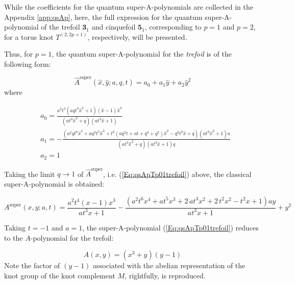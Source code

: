 \documentclass[a4paper,titlepage,twoside]{book}
\begin{document}
While the coefficients for the quantum super-A-polynomials are collected in the Appendix \ref{app:qsAp}, here, the full expression for the quantum super-A-polynomial of the trefoil $\mathbf{3}_1$ and cinquefoil $\mathbf{5}_1$, corresponding to $p=1$ and $p=2$, for a torus knot $T^{(2,2p+1)}$, respectively, will be presented.  

Thus, for $p=1$, the quantum super-A-polynomial for the \emph{trefoil} is of the following form:

\begin{equation}
  \widehat{A}^{\text{super}}(\widehat{x}, \widehat{y}; a, q, t ) = a_0 + a_1 \widehat{y} + a_2\widehat{y}^2 \label{Eq:qsApTp01trefoil}
\end{equation}
where

\[
\begin{aligned}
  & a_0 =  \frac{a^{2} t^{4} {\left(a q t^{3} \widehat{x}^{2} + 1\right)}  {\left(\widehat{x} - 1\right)} \widehat{x}^{3}}{{\left(a t^{3} \widehat{x}^{2} + q\right)} {\left(a t^{3} \widehat{x} + 1\right)}} \\
  & a_1 = -\frac{{\left( a^2 q t^6 \widehat{x}^4+a q^2 t^5 \widehat{x}^3+ t^2 (a q^2 t  +a t  +q^3   +q^2  ) \widehat{x}^2-q^2 t^2 \widehat{x}+q\right)} {\left(a t^{3} \widehat{x}^{2} + 1\right)} a }{{\left(a t^{3} \widehat{x}^{2} + q\right)} {\left(a t^{3} \widehat{x} + 1\right)} q}  \\
  & a_2 = 1 
\end{aligned}
\]

Taking the limit $q \to 1$ of $\widehat{A}^{\text{super}}$, i.e. (\ref{Eq:qsApTp01trefoil}) above, the classical super-A-polynomial is obtained:

\begin{equation}
  A^{\text{super}}(x,y;a,t) = \frac{a^{2} t^{4} {\left(x - 1\right)} x^{3}}{a t^{3} x + 1} - \frac{ 
{\left(a^{2} t^{6} x^{4} + a t^{5} x^{3} + 2 \, a t^{3} x^{2} + 2 \, t^{2} x^{2} - t^{2} x + 1\right)} a 
    y}{a t^{3} x + 1} + y^{2}
\end{equation}

Taking $t=-1$ and $a=1$, the super-A-polynomial (\ref{Eq:qsApTp01trefoil}) reduces to the $A$-polynomial for the trefoil:

\begin{equation}
A(x,y) = {\left(x^{3} + y\right)} {\left(y - 1\right)}
\end{equation}
Note the factor of $(y-1)$ associated with the abelian representation of the knot group of the knot complement $M$, rightfully, is reproduced.  
\end{document}
